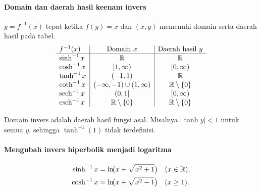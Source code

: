 \documentclass{../../kalkulus-ppt}
\DeclareMathOperator{\sech}{sech}
\DeclareMathOperator{\csch}{csch}
\begin{document}
\begin{frame}{\insertsection}
    \framesubtitle{Domain dan daerah hasil keenam invers}
    \begin{teorema}
        $y=f^{-1}(x)$ tepat ketika $f(y)=x$ dan $(x,y)$ memenuhi
        domain serta daerah hasil pada tabel.
        \[
            \begin{array}{l|c|c}
                f^{-1}(x)&\text{Domain }x&\text{Daerah hasil }y\\ \hline
                \sinh^{-1}x&\R&\R\\
                \cosh^{-1}x&[1,\infty)&[0,\infty)\\
                \tanh^{-1}x&(-1,1)&\R\\
                \coth^{-1}x&(-\infty,-1)\cup(1,\infty)&\R\setminus\{0\}\\
                \sech^{-1}x&(0,1]&[0,\infty)\\
                \csch^{-1}x&\R\setminus\{0\}&\R\setminus\{0\}
            \end{array}
        \]
    \end{teorema}
    Domain invers adalah daerah hasil fungsi asal. Misalnya
    $|\tanh y|<1$ untuk semua $y$, sehingga $\tanh^{-1}(1)$ tidak terdefinisi.
\end{frame}

\begin{frame}{\insertsection}
    \framesubtitle{Mengubah invers hiperbolik menjadi logaritma}
    \begin{teorema}
        \[
            \begin{aligned}
                \sinh^{-1}x&=\ln\!\bigl(x+\sqrt{x^2+1}\bigr) &&(x\in\mathbb{R}),\\
                \cosh^{-1}x&=\ln\!\bigl(x+\sqrt{x^2-1}\bigr) &&(x\ge1).
            \end{aligned}
        \]
    \end{teorema}
\end{frame}
\end{document}
